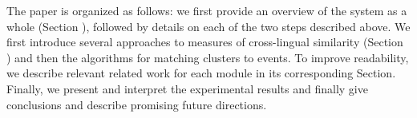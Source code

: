 \documentclass[twoside,11pt]{article}
\newcommand{\oldText}[1]{\textcolor{red}{#1:}\color{blue}}
\begin{document}
The paper is organized as follows: we first provide an overview of the system as a whole (Section ), followed by details on each of the two steps described above. We first introduce several approaches to measures of cross-lingual similarity (Section ) and then the algorithms for matching clusters to events.  To improve readability, we describe relevant related work for each module in its corresponding Section.
Finally, we present and interpret the experimental results and finally give conclusions and describe promising future directions.
%
%
%
%
%
\end{document}
